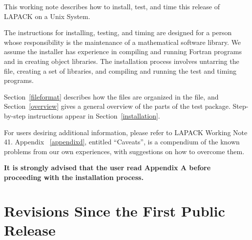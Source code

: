 This working note describes how to install, test, and time this
release of LAPACK on a Unix System.

The instructions for installing, testing, and timing are designed for a 
person whose
responsibility is the maintenance of a mathematical software library.
We assume the installer has experience in compiling and running 
Fortran programs and in creating object libraries.
The installation process involves untarring the file, creating a set of
libraries, and compiling and running the test and timing programs.


Section~\ref{fileformat} describes how the files are organized in the
file, and
Section~\ref{overview} gives a general overview of the parts of the test package.
Step-by-step instructions appear in Section~\ref{installation}.

For users desiring additional information, please refer to LAPACK
Working Note 41.
Appendix ~\ref{appendixd}, entitled ``Caveats'', is a compendium of the known 
problems from our own experiences, with suggestions on how to 
overcome them.

{\bf It is strongly advised that the user read Appendix
A before proceeding with the installation process.}

\section{Revisions Since the First Public Release}

